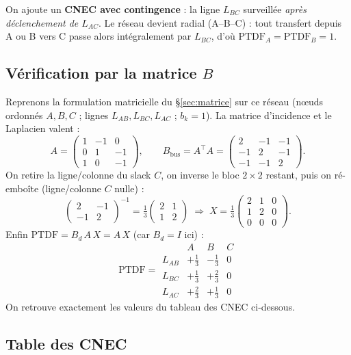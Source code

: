 \documentclass[11pt,a4paper]{article}
\newcommand{\PTDF}{\mathrm{PTDF}}
\begin{document}
On ajoute un \textbf{CNEC avec contingence} : la ligne $L_{BC}$ surveillée
\emph{après déclenchement de $L_{AC}$}. Le réseau devient radial
(A--B--C) : tout transfert depuis A ou B vers C passe alors intégralement
par $L_{BC}$, d'où $\PTDF_A = \PTDF_B = 1$.

\subsection{Vérification par la matrice \texorpdfstring{$B$}{B}}

Reprenons la formulation matricielle du \S\ref{sec:matrice} sur ce réseau
(n\oe{}uds ordonnés $A,B,C$ ; lignes $L_{AB},L_{BC},L_{AC}$ ; $b_k=1$). La
matrice d'incidence et le Laplacien valent :
\[
  A = \begin{pmatrix} 1 & -1 & 0\\ 0 & 1 & -1\\ 1 & 0 & -1\end{pmatrix},
  \qquad
  B_{\mathrm{bus}} = A^{\top}A =
  \begin{pmatrix} 2 & -1 & -1\\ -1 & 2 & -1\\ -1 & -1 & 2\end{pmatrix}.
\]
On retire la ligne/colonne du slack $C$, on inverse le bloc $2\times2$
restant, puis on ré-emboîte (ligne/colonne $C$ nulle) :
\[
  \begin{pmatrix} 2 & -1\\ -1 & 2\end{pmatrix}^{-1}
   = \tfrac13\begin{pmatrix} 2 & 1\\ 1 & 2\end{pmatrix}
  \;\Longrightarrow\;
  X = \tfrac13\begin{pmatrix} 2 & 1 & 0\\ 1 & 2 & 0\\ 0 & 0 & 0\end{pmatrix}.
\]
Enfin $\mathrm{PTDF} = B_d\,A\,X = A\,X$ (car $B_d=I$ ici) :
\[
  \mathrm{PTDF} =
  \begin{array}{r|ccc}
     & A & B & C\\\hline
    L_{AB} & +\tfrac13 & -\tfrac13 & 0\\
    L_{BC} & +\tfrac13 & +\tfrac23 & 0\\
    L_{AC} & +\tfrac23 & +\tfrac13 & 0
  \end{array}
\]
On retrouve exactement les valeurs du tableau des CNEC ci-dessous.

\subsection{Table des CNEC}
\end{document}
